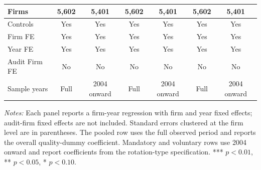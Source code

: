 \documentclass[10pt]{article}
\begin{document}
\begin{minipage}{19cm}
\begin{threeparttable}
\begin{tabular}{l cc cc cc}
Firms & 5,602 & 5,401 & 5,602 & 5,401 & 5,602 & 5,401 \\
\midrule
Controls & Yes & Yes & Yes & Yes & Yes & Yes \\
Firm FE & Yes & Yes & Yes & Yes & Yes & Yes \\
Year FE & Yes & Yes & Yes & Yes & Yes & Yes \\
Audit Firm FE & No & No & No & No & No & No \\
Sample years & Full & 2004 onward & Full & 2004 onward & Full & 2004 onward \\
\bottomrule
\end{tabular}
\begin{tablenotes}\fontsize{9}{11}\selectfont
\item \fontsize{9}{11}\selectfont \textit{Notes:} Each panel reports a firm-year regression with firm and year fixed effects; audit-firm fixed effects are not included. Standard errors clustered at the firm level are in parentheses. The pooled row uses the full observed period and reports the overall quality-dummy coefficient. Mandatory and voluntary rows use 2004 onward and report coefficients from the rotation-type specification. *** \(p<0.01\), ** \(p<0.05\), * \(p<0.10\).
\end{tablenotes}
\end{threeparttable}

\end{minipage}
\end{document}
